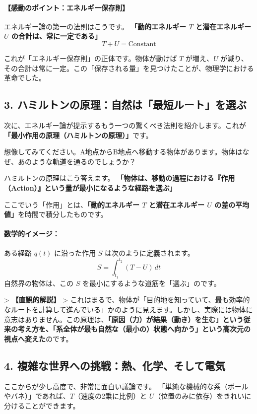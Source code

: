 \documentclass[a4paper,11pt,openany]{ltjsbook}
\begin{document}
\begin{lecturebox}
\paragraph{【感動のポイント：エネルギー保存則】}
エネルギー論の第一の法則はこうです。
\textbf{「動的エネルギー $T$ と潜在エネルギー $U$ の合計は、常に一定である」}
$$T + U = \text{Constant}$$

これが「エネルギー保存則」の正体です。物体が動けば $T$ が増え、$U$ が減り、その合計は常に一定。この「保存される量」を見つけたことが、物理学における革命でした。

\subsection*{3. ハミルトンの原理：自然は「最短ルート」を選ぶ}

次に、エネルギー論が提示するもう一つの驚くべき法則を紹介します。これが\textbf{「最小作用の原理（ハミルトンの原理）」}です。

想像してみてください。A地点からB地点へ移動する物体があります。物体はなぜ、あのような軌道を通るのでしょうか？

ハミルトンの原理はこう答えます。
\textbf{「物体は、移動の過程における『作用（Action）』という量が最小になるような経路を選ぶ」}

ここでいう「作用」とは、\textbf{「動的エネルギー $T$ と潜在エネルギー $U$ の差の平均値」}を時間で積分したものです。

\paragraph{数学的イメージ：}
ある経路 $q(t)$ に沿った作用 $S$ は次のように定義されます。
$$S = \int_{t_1}^{t_2} (T - U) \, dt$$
自然界の物体は、この $S$ を最小にするような道筋を「選ぶ」のです。

> \textbf{【直観的解説】}
> これはまるで、物体が「目的地を知っていて、最も効率的なルートを計算して進んでいる」かのように見えます。しかし、実際には物体に意志はありません。この原理は、\textbf{「原因（力）が結果（動き）を生む」という従来の考え方を、「系全体が最も自然な（最小の）状態へ向かう」という高次元の視点へ変えた}のです。

\subsection*{4. 複雑な世界への挑戦：熱、化学、そして電気}

ここからが少し高度で、非常に面白い議論です。
「単純な機械的な系（ボールやバネ）」であれば、$T$（速度の2乗に比例）と $U$（位置のみに依存）をきれいに分けることができます。


\end{lecturebox}
\end{document}
